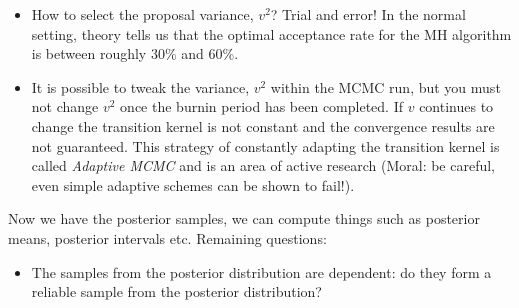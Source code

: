 \documentclass[11pt]{article}
\begin{document}
\begin{itemize}
\begin{itemize}
\begin{itemize}
    \item How to select the proposal variance, $v^{2}$? Trial and error! In the normal setting, theory tells us that the optimal acceptance rate for the MH algorithm is between roughly $30\%$ and $60\%$. 
    \item It is possible to tweak the variance, $v^{2}$ within the MCMC run, but you must not change $v^{2}$ once the burnin period has been completed. If $v$ continues to change the transition kernel is not constant and the convergence results are not guaranteed. This strategy of constantly adapting the transition kernel is called \emph{Adaptive MCMC} and is an area of active research (Moral: be careful, even simple adaptive schemes can be shown to fail!). 
    \end{itemize}
    
    Now we have the posterior samples, we can compute things such as posterior means, posterior intervals etc.  Remaining questions:
    \begin{itemize}
    \item The samples from the posterior distribution are dependent: do they form a reliable sample from the posterior distribution?
    \end{itemize}
  \end{itemize}
    

\end{itemize}
\end{document}
